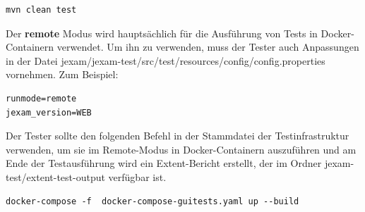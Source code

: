\begin{lstlisting}[caption={Maven Test Command}]
mvn clean test
\end{lstlisting}

Der \textbf{remote} Modus wird hauptsächlich für die
Ausführung von Tests in Docker-Containern verwendet.
Um ihn zu verwenden, muss der Tester auch
Anpassungen in der Datei
jexam/jexam-test/src/test/resources/config/config.properties
vornehmen. Zum Beispiel:

\begin{lstlisting}[caption={config.properties}]
runmode=remote
jexam_version=WEB
\end{lstlisting}

Der Tester sollte den folgenden Befehl in der
Stammdatei der Testinfrastruktur verwenden, um sie
im Remote-Modus in Docker-Containern auszuführen und am
Ende der Testausführung wird ein Extent-Bericht
erstellt, der im Ordner jexam-test/extent-test-output
verfügbar ist.

\begin{lstlisting}[caption={docker-compose execution command}]
docker-compose -f  docker-compose-guitests.yaml up --build
\end{lstlisting}

